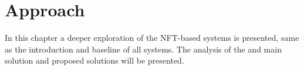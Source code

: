 \chapter{Approach}
\label{ch:approach:main}

In this chapter a deeper exploration of the \ac{NFT}-based systems is presented, same as the introduction and baseline of all systems. The analysis of the and main solution and proposed solutions will be presented.